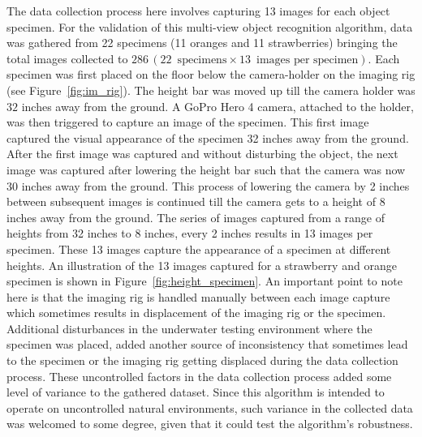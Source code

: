 \documentclass {udthesis}
\begin{document}
The data collection process here involves capturing 13 images for each object specimen. For the validation of this multi-view object recognition algorithm, data was gathered from 22 specimens (11 oranges and 11 strawberries) bringing the total images collected to $286\, (22\enspace \text{specimens} \times 13\enspace \text{images per specimen})$. Each specimen was first placed on the floor below the camera-holder on the imaging rig (see Figure~\ref{fig:im_rig}). The height bar was moved up till the camera holder was $32$ inches away from the ground. A GoPro Hero 4 camera, attached to the holder, was then triggered to capture an image of the specimen. This first image captured the visual appearance of the specimen 32 inches away from the ground. After the first image was captured and without disturbing the object, the next image was captured after lowering the height bar such that the camera was now $30$ inches away from the ground.
This process of lowering the camera by 2 inches between subsequent images is continued till the camera gets to a height of $8$ inches away from the ground. 
The series of images captured from a range of heights from 32 inches to 8 inches, every 2 inches results in 13 images per specimen. 
These 13 images capture the appearance of a specimen at different heights. An illustration of the 13 images captured for a strawberry and orange specimen is shown in Figure~\ref{fig:height_specimen}. An important point to note here is that the imaging rig is handled manually between each image capture which sometimes results in displacement of the imaging rig or the specimen. 
Additional disturbances in the underwater testing environment where the specimen was placed, added another source of inconsistency that sometimes lead to the specimen or the imaging rig getting displaced during the data collection process. These uncontrolled factors in the data collection process added some level of variance to the gathered dataset.
Since this algorithm is intended to operate on uncontrolled natural environments, such variance in the collected data was welcomed to some degree, given that it could test the algorithm's robustness.
\end{document}
